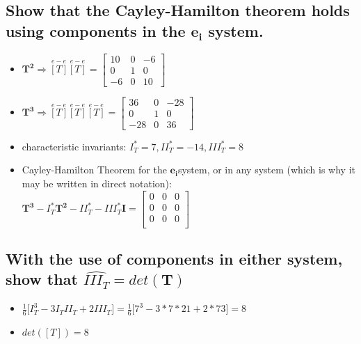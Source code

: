 \documentclass[10pt, letterpaper]{article}
\begin{document}
	\subsection{Show that the Cayley-Hamilton theorem holds using components in the $\bm{e_i}$ system.}
		\begin{itemize}
		\item $\bm{T^2} \Rightarrow \overset{e-e}{[T]} \overset{e-e}{[T]} = \begin{bmatrix}
			10 & 0 & -6 \\
			0 & 1 & 0 \\
			-6 & 0 & 10
			\end{bmatrix}$

		\item $\bm{T^3} \Rightarrow \overset{e-e}{[T]}\overset{e-e}{[T]}\overset{e-e}{[T]}= \begin{bmatrix}
			36 & 0 & -28 \\
			0 & 1 & 0 \\
			-28 & 0 & 36
			\end{bmatrix}$	
		\item characteristic invariants:  $I^*_T = 7, II^*_T = -14, III^*_T = 8$
		\item Cayley-Hamilton Theorem for the $\bm{e_i} $system, or in any system (which is why it may be written in 
			direct notation):\\ 
			$\bm{T^3} - I^*_T \bm{ T^2} - II^*_T -III^*_T \bm{I} =
			 \begin{bmatrix} 0 & 0 & 0 \\ 0 & 0 & 0 \\ 0 & 0 & 0\\ \end{bmatrix}$
		\end{itemize}
	\subsection{ With the use of components in either system, show that $\hat{III_T} = det(\bm{T})$}
		\begin{itemize}
		\item $\frac{1}{6} \Big[ I^3_T - 3I_T II_T + 2 III_T \Big] = \frac{1}{6} \Big[ 7^3 - 3 * 7 * 21 + 2 * 73 \Big] = 8$
		\item $ det \left( [T] \right) = 8$
		\end{itemize}
	
\end{document}
